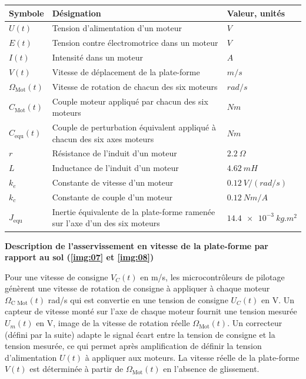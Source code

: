 \begin{center}
\begin{tabular}{lll}
\hline
\textbf{Symbole} & \textbf{Désignation} & \textbf{Valeur, unités} \\  \hline
$U(t)$  			& Tension d'alimentation d'un moteur 		& $\si{V}$ \\ 
$E(t)$ 			& Tension contre électromotrice dans un moteur 	& $\si{V}$ \\ 
$I (t)$			& Intensité dans un moteur 			& $\si{A}$ \\ 
$V(t)$ 			& Vitesse de déplacement de la plate-forme 		& $\si{m/s}$\\ 
$\Omega_{\text{Mot}}(t)$& Vitesse de rotation de chacun des six moteurs	& $\si{rad/s}$ \\
$C_{\text{Mot}}(t)$ 	& Couple moteur appliqué par chacun des six moteurs & $\si{Nm}$ \\ 
$C_{\text{equ}}(t)$ 	& Couple de perturbation équivalent appliqué à chacun des six axes moteurs
& $\si{Nm}$ \\ 
$r$ 			& Résistance de l'induit d'un moteur 		& $\SI{2,2}{\Omega}$ \\ 
$L$ 			& Inductance de l'induit d'un moteur 	& $\SI{4,62}{mH}$ \\ 
$k_e$ 			& Constante de vitesse d'un moteur 	& $\SI{0,12}{V/(rad/s)}$ \\ 
$k_c$ 			& Constante de couple d'un moteur 		& $\SI{0,12}{Nm/A}$ \\ 
$J_{\text{equ}}$		& Inertie équivalente de la plate-forme ramenée sur l'axe d'un des six moteurs
& $\SI{14,4e-3}{kg.m^2}$ \\ \hline
\end{tabular}
\end{center}

\textbf{Description de l'asservissement en vitesse de la plate-forme par rapport au sol (\autoref{img:07} et \autoref{img:08})}

Pour une vitesse de consigne $V_C (t)$ en \si{m/s}, les microcontrôleurs de pilotage génèrent une vitesse de rotation de consigne à appliquer à chaque moteur $\Omega_{\text{C Mot}}(t)$ \si{rad/s} qui est convertie en une tension de consigne $U_C (t)$ en \si{V}. Un capteur de vitesse monté sur l'axe de chaque moteur fournit une tension mesurée $U_m (t)$ en \si{V}, image de la vitesse de rotation réelle $\Omega_{\text{Mot}}(t)$. Un correcteur (défini par la suite) adapte le signal écart entre la tension de consigne et la tension mesurée, ce qui permet après amplification de définir la tension d'alimentation $U(t)$ à appliquer aux moteurs. La vitesse réelle de la plate-forme $V (t)$ est déterminée à partir de $\Omega_{\text{Mot}}(t)$ en l'absence de glissement.

